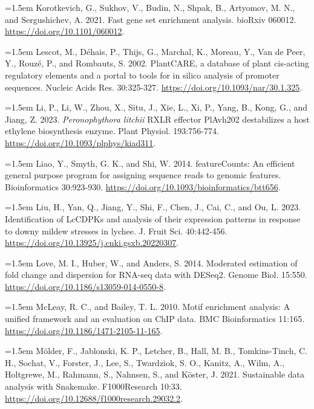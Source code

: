 \documentclass[12pt,letterpaper]{article}
\begin{document}
\noindent\hangindent=1.5em Korotkevich, G., Sukhov, V., Budin, N., Shpak, B., Artyomov, M. N., and Sergushichev, A. 2021. Fast gene set enrichment analysis. bioRxiv 060012. \url{https://doi.org/10.1101/060012}.\par

\noindent\hangindent=1.5em Lescot, M., Déhais, P., Thijs, G., Marchal, K., Moreau, Y., Van de Peer, Y., Rouzé, P., and Rombauts, S. 2002. PlantCARE, a database of plant cis-acting regulatory elements and a portal to tools for in silico analysis of promoter sequences. Nucleic Acids Res. 30:325-327. \url{https://doi.org/10.1093/nar/30.1.325}.\par

\noindent\hangindent=1.5em Li, P., Li, W., Zhou, X., Situ, J., Xie, L., Xi, P., Yang, B., Kong, G., and Jiang, Z. 2023. \textit{Peronophythora litchii} RXLR effector PlAvh202 destabilizes a host ethylene biosynthesis enzyme. Plant Physiol. 193:756-774. \url{https://doi.org/10.1093/plphys/kiad311}.\par

\noindent\hangindent=1.5em Liao, Y., Smyth, G. K., and Shi, W. 2014. featureCounts: An efficient general purpose program for assigning sequence reads to genomic features. Bioinformatics 30:923-930. \url{https://doi.org/10.1093/bioinformatics/btt656}.\par

\noindent\hangindent=1.5em Liu, H., Yan, Q., Jiang, Y., Shi, F., Chen, J., Cai, C., and Ou, L. 2023. Identification of LcCDPKs and analysis of their expression patterns in response to downy mildew stresses in lychee. J. Fruit Sci. 40:442-456. \url{https://doi.org/10.13925/j.cnki.gsxb.20220307}.\par

\noindent\hangindent=1.5em Love, M. I., Huber, W., and Anders, S. 2014. Moderated estimation of fold change and dispersion for RNA-seq data with DESeq2. Genome Biol. 15:550. \url{https://doi.org/10.1186/s13059-014-0550-8}.\par

\noindent\hangindent=1.5em McLeay, R. C., and Bailey, T. L. 2010. Motif enrichment analysis: A unified framework and an evaluation on ChIP data. BMC Bioinformatics 11:165. \url{https://doi.org/10.1186/1471-2105-11-165}.\par

\noindent\hangindent=1.5em Mölder, F., Jablonski, K. P., Letcher, B., Hall, M. B., Tomkins-Tinch, C. H., Sochat, V., Forster, J., Lee, S., Twardziok, S. O., Kanitz, A., Wilm, A., Holtgrewe, M., Rahmann, S., Nahnsen, S., and Köster, J. 2021. Sustainable data analysis with Snakemake. F1000Research 10:33. \url{https://doi.org/10.12688/f1000research.29032.2}.\par
\end{document}
